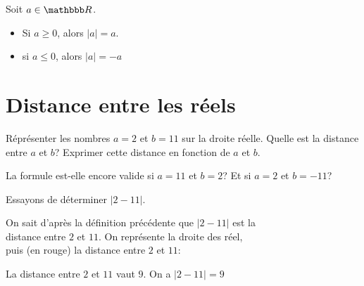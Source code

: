 \documentclass[10pt,a4paper,openany,twoside,prof]{book}
\begin{document}
\begin{prop}{}{}
  Soit $a\in\R$.
  \begin{itemize}
    \item Si $a\ge0$, alors $|a| =  a$.
    \item si $a\le0$, alors $|a| =  -a$
  \end{itemize}
\end{prop}

\section{Distance entre les réels}

\begin{ex}{}{}
  Réprésenter les nombres $a=2$ et $b=11$ sur la droite réelle. Quelle est la distance entre $a$ et $b$? Exprimer cette distance en fonction de $a$ et $b$.

  La formule est-elle encore valide si $a=11$ et $b=2$? Et si $a=2$ et $b=-11$?

  Essayons de déterminer $|2-11|$.\medskip

 On sait d'après la définition précédente que $|2-11|$ est la \\distance entre $2$ et $11$. On représente la droite des réel, \\puis (en rouge) la distance entre $2$ et $11$:
\\
\vspace{-19mm}
\begin{flushright}
\end{flushright}

 La distance entre $2$ et $11$ vaut $9$. On a $|2-11| = 9$
\end{ex}
\end{document}
